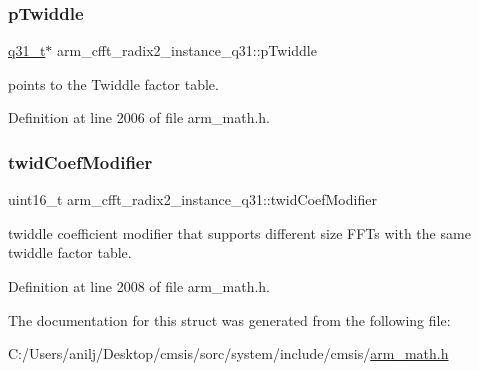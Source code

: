 \subsubsection{\texorpdfstring{p\+Twiddle}{pTwiddle}}
{\footnotesize\ttfamily \hyperlink{arm__math_8h_adc89a3547f5324b7b3b95adec3806bc0}{q31\+\_\+t}$\ast$ arm\+\_\+cfft\+\_\+radix2\+\_\+instance\+\_\+q31\+::p\+Twiddle}

points to the Twiddle factor table. 

Definition at line 2006 of file arm\+\_\+math.\+h.

\mbox{\label{structarm__cfft__radix2__instance__q31_ae63ca9193322cd477970c1d2086407d1}} 
\subsubsection{\texorpdfstring{twid\+Coef\+Modifier}{twidCoefModifier}}
{\footnotesize\ttfamily uint16\+\_\+t arm\+\_\+cfft\+\_\+radix2\+\_\+instance\+\_\+q31\+::twid\+Coef\+Modifier}

twiddle coefficient modifier that supports different size F\+F\+Ts with the same twiddle factor table. 

Definition at line 2008 of file arm\+\_\+math.\+h.



The documentation for this struct was generated from the following file\+:\begin{DoxyCompactItemize}
\item 
C\+:/\+Users/anilj/\+Desktop/cmsis/sorc/system/include/cmsis/\hyperlink{arm__math_8h}{arm\+\_\+math.\+h}\end{DoxyCompactItemize}
